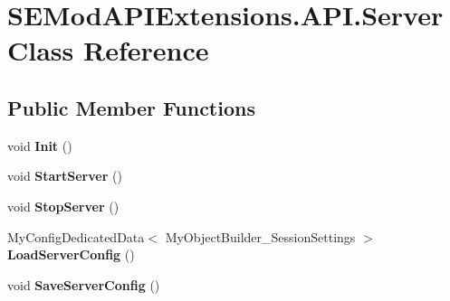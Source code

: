 \hypertarget{class_s_e_mod_a_p_i_extensions_1_1_a_p_i_1_1_server}{}\section{S\+E\+Mod\+A\+P\+I\+Extensions.\+A\+P\+I.\+Server Class Reference}
\label{class_s_e_mod_a_p_i_extensions_1_1_a_p_i_1_1_server}
\subsection*{Public Member Functions}
\begin{DoxyCompactItemize}
\item 
\hypertarget{class_s_e_mod_a_p_i_extensions_1_1_a_p_i_1_1_server_ac77c3934c88aa3deedaf6d57fa129f43}{}void {\bfseries Init} ()\label{class_s_e_mod_a_p_i_extensions_1_1_a_p_i_1_1_server_ac77c3934c88aa3deedaf6d57fa129f43}

\item 
\hypertarget{class_s_e_mod_a_p_i_extensions_1_1_a_p_i_1_1_server_afc645aa97059fb74d5a8533323bc639a}{}void {\bfseries Start\+Server} ()\label{class_s_e_mod_a_p_i_extensions_1_1_a_p_i_1_1_server_afc645aa97059fb74d5a8533323bc639a}

\item 
\hypertarget{class_s_e_mod_a_p_i_extensions_1_1_a_p_i_1_1_server_a508b6ab808b3590256cc0e274e557ec2}{}void {\bfseries Stop\+Server} ()\label{class_s_e_mod_a_p_i_extensions_1_1_a_p_i_1_1_server_a508b6ab808b3590256cc0e274e557ec2}

\item 
\hypertarget{class_s_e_mod_a_p_i_extensions_1_1_a_p_i_1_1_server_a555f908bf6aacdaf31989f5558e0dd80}{}My\+Config\+Dedicated\+Data$<$ My\+Object\+Builder\+\_\+\+Session\+Settings $>$ {\bfseries Load\+Server\+Config} ()\label{class_s_e_mod_a_p_i_extensions_1_1_a_p_i_1_1_server_a555f908bf6aacdaf31989f5558e0dd80}

\item 
\hypertarget{class_s_e_mod_a_p_i_extensions_1_1_a_p_i_1_1_server_a14be5cdc722e8e8d231b78d48e02b311}{}void {\bfseries Save\+Server\+Config} ()\label{class_s_e_mod_a_p_i_extensions_1_1_a_p_i_1_1_server_a14be5cdc722e8e8d231b78d48e02b311}

\end{DoxyCompactItemize}
